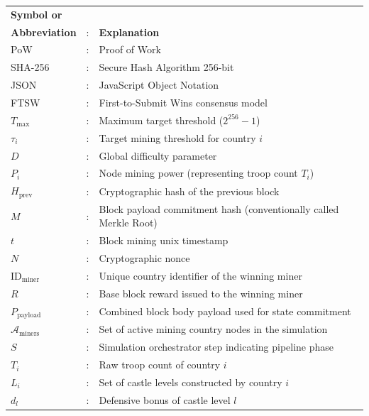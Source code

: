 \begin{tabular}{lcl}
    \textbf{Symbol or}&&\\
    \textbf{Abbreviation} &:& \textbf{Explanation}\\
    
    
    PoW &:& Proof of Work\\
    SHA-256 &:& Secure Hash Algorithm 256-bit\\
    JSON &:& JavaScript Object Notation\\
    FTSW &:& First-to-Submit Wins consensus model\\
    $T_{\max}$ &:& Maximum target threshold ($2^{256} - 1$)\\
    $\tau_i$ &:& Target mining threshold for country $i$\\
    $D$ &:& Global difficulty parameter\\
    $P_i$ &:& Node mining power (representing troop count $T_i$)\\
    $H_{\text{prev}}$ &:& Cryptographic hash of the previous block\\
    $M$ &:& Block payload commitment hash (conventionally called Merkle Root)\\
    $t$ &:& Block mining unix timestamp\\
    $N$ &:& Cryptographic nonce\\
    $\text{ID}_{\text{miner}}$ &:& Unique country identifier of the winning miner\\
    $R$ &:& Base block reward issued to the winning miner\\
    $P_{\text{payload}}$ &:& Combined block body payload used for state commitment\\
    $\mathcal{A}_{\text{miners}}$ &:& Set of active mining country nodes in the simulation\\
    $S$ &:& Simulation orchestrator step indicating pipeline phase\\
    $T_i$ &:& Raw troop count of country $i$\\
    $L_i$ &:& Set of castle levels constructed by country $i$\\
    $d_l$ &:& Defensive bonus of castle level $l$\\

\end{tabular}
